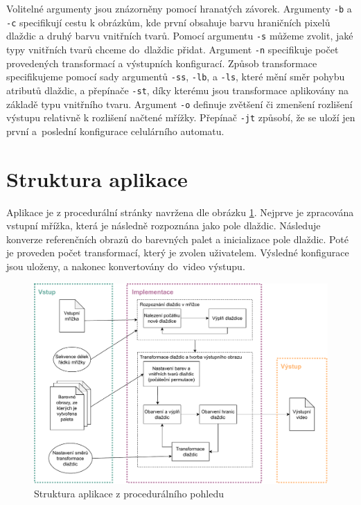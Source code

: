 Volitelné argumenty jsou znázorněny pomocí hranatých závorek. Argumenty  \verb|-b| a \verb|-c| specifikují cestu k obrázkům, kde první obsahuje barvu hraničních pixelů dlaždic a druhý barvu vnitřních tvarů. Pomocí argumentu \verb|-s| můžeme zvolit, jaké typy vnitřních tvarů chceme do~dlaždic přidat. Argument \verb|-n| specifikuje počet provedených transformací a výstupních konfigurací. Způsob transformace specifikujeme pomocí sady argumentů \verb|-ss|, \verb|-lb|, a \verb|-ls|, které mění směr pohybu atributů dlaždic, a přepínače \verb|-st|, díky kterému jsou transformace aplikovány na základě typu vnitřního tvaru. Argument \verb|-o| definuje zvětšení či zmenšení rozlišení výstupu relativně k rozlišení načtené mřížky. Přepínač \verb|-jt| způsobí, že se uloží jen první a~poslední konfigurace celulárního automatu.

\section{Struktura aplikace}

Aplikace je z procedurální stránky navržena dle obrázku \ref{fig:Structure}. Nejprve je zpracována vstupní mřížka, která je následně rozpoznána jako pole dlaždic. Následuje konverze referenčních obrazů do barevných palet a inicializace pole dlaždic. Poté je proveden počet transformací, který je zvolen uživatelem. Výsledné konfigurace jsou uloženy, a nakonec konvertovány do~video výstupu.

\begin{figure}[H]
    \centering
    \includegraphics[width=\textwidth]{obrazky-figures/StrukturaAplikace.pdf}
    \caption{Struktura aplikace z procedurálního pohledu}
    \label{fig:Structure}
\end{figure}

